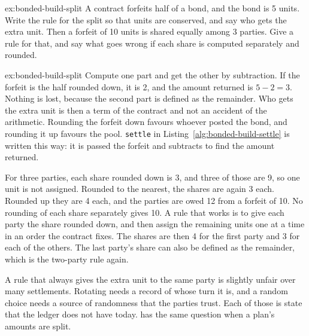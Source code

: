\documentclass[11pt,a4paper]{article}
\theoremstyle{definition}
\theoremstyle{remark}
\begin{document}
\begin{pdexercise}[kind=Open,rating=3]{ex:bonded-build-split}
A contract forfeits half of a bond, and the bond is 5 units. Write the rule for the split so that units are conserved, and say who gets the extra unit. Then a forfeit of 10 units is shared equally among 3 parties. Give a rule for that, and say what goes wrong if each share is computed separately and rounded.
\end{pdexercise}
\begin{pdsolution}{ex:bonded-build-split}
Compute one part and get the other by subtraction. If the forfeit is the half rounded down, it is 2, and the amount returned is $5-2=3$. Nothing is lost, because the second part is defined as the remainder. Who gets the extra unit is then a term of the contract and not an accident of the arithmetic. Rounding the forfeit down favours whoever posted the bond, and rounding it up favours the pool. \texttt{settle} in Listing~\ref{alg:bonded-build-settle} is written this way: it is passed the forfeit and subtracts to find the amount returned.

For three parties, each share rounded down is 3, and three of those are 9, so one unit is not assigned. Rounded to the nearest, the shares are again 3 each. Rounded up they are 4 each, and the parties are owed 12 from a forfeit of 10. No rounding of each share separately gives 10. A rule that works is to give each party the share rounded down, and then assign the remaining units one at a time in an order the contract fixes. The shares are then 4 for the first party and 3 for each of the others. The last party's share can also be defined as the remainder, which is the two-party rule again.

A rule that always gives the extra unit to the same party is slightly unfair over many settlements. Rotating needs a record of whose turn it is, and a random choice needs a source of randomness that the parties trust. Each of those is state that the ledger does not have today.  has the same question when a plan's amounts are split.
\end{pdsolution}

\end{document}
